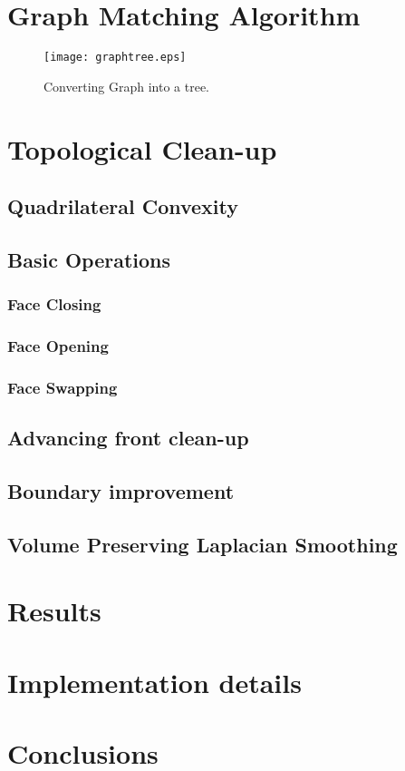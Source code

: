 \documentclass[11pt, a4paper]{paper}
\begin{document}
\section { Graph Matching Algorithm }
\begin{figure}
 \begin{center}
 \texttt{[image: graphtree.eps]}
 \caption{Converting Graph into a tree.}
 \end{center}
 \label{fig:graph_tree}
\end{figure} 
\section { Topological Clean-up}
\subsection{ Quadrilateral Convexity }
\subsection{ Basic Operations}
\subsubsection{ Face Closing }
\subsubsection{ Face Opening }
\subsubsection{ Face Swapping }
\subsection { Advancing front clean-up}
\subsection { Boundary improvement}
\subsection { Volume Preserving Laplacian Smoothing}
\section {Results}
\section { Implementation details }

\section {Conclusions}
\end{document}
